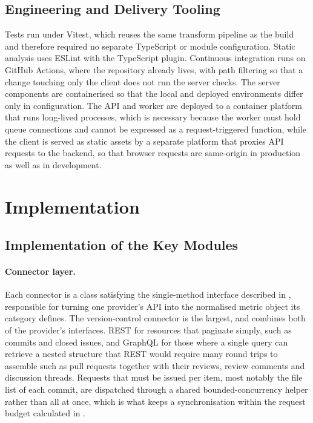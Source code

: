 \subsection{Engineering and Delivery Tooling}
\label{subsec:tool-delivery}

Tests run under Vitest, which reuses the same transform pipeline as the build and
therefore required no separate TypeScript or module configuration. Static
analysis uses ESLint with the TypeScript plugin. Continuous integration runs on
GitHub Actions, where the repository already lives, with path filtering so that a
change touching only the client does not run the server checks. The server
components are containerised so that the local and deployed environments differ
only in configuration. The API and worker are deployed to a container platform
that runs long-lived processes, which is necessary because the worker must hold queue
connections and cannot be expressed as a request-triggered function, while the
client is served as static assets by a separate platform that proxies API
requests to the backend, so that browser requests are same-origin in production
as well as in development.



\section{Implementation}
\label{sec:implementation}

\subsection{Implementation of the Key Modules}
\label{subsec:module-implementation}

\paragraph{Connector layer.}
Each connector is a class satisfying the single-method interface described in
, responsible for turning one provider's
API into the normalised metric object its category defines. The version-control
connector is the largest, and combines both of the provider's interfaces. REST
for resources that paginate simply, such as commits and closed issues, and
GraphQL for those where a single query can retrieve a nested structure that REST
would require many round trips to assemble such as pull requests together with their
reviews, review comments and discussion threads. Requests that must be issued per
item, most notably the file list of each commit, are dispatched through a shared
bounded-concurrency helper rather than all at once, which is what keeps a
synchronisation within the request budget calculated in
.

